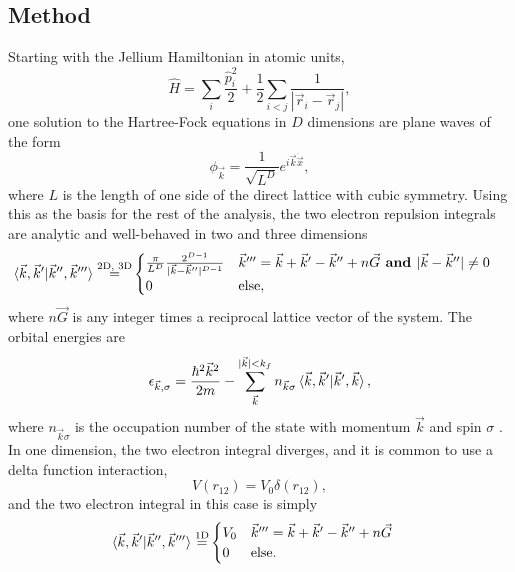 \documentclass[preprint, journal=prl]{revtex4-1}
\begin{document}
\subsection{Method}
  Starting with the Jellium Hamiltonian in atomic units, 
  \begin{equation}\label{hamiltonian}
   	\hat{H} = \sum_i \frac{\hat{p}_i^2}{2}  + \frac{1}{2} \sum_{i < j} \frac{1}{|\vec{r}_i - 
   	\vec{r}_j|},
  \end{equation}
  one solution to the Hartree-Fock equations in $D$ dimensions are plane waves of the form	
  \begin{equation}\label{planewave}
   	\phi_{\vec{k}} =
    \frac{1} { \sqrt{L ^ D} } e ^ {i \vec{k} \dot \vec{x}},
  \end{equation}
  where $L$ is the length of one side of the direct lattice with cubic symmetry. Using this as the basis for the rest of the analysis, the two electron repulsion integrals are analytic and  well-behaved in two and three dimensions\cite{Delyon2008, Guiliani2005}
  \begin{align}
    \braket{\vec{k}, \vec{k}' | \vec{k}'', \vec{k}'''} 
    \stackrel{ \text{2D, 3D} }{=}&
    \begin{cases} 
      \frac{\pi} {L ^ D} \frac{ 2^{D-1} } { | \vec{k} - \vec{k}'' | ^ {D-1} } 
      & \vec{k}''' = \vec{k} + \vec{k}' - \vec{k}'' + n\vec{G} \textbf{ and } | \vec{k} - 
      \vec{k}''| \neq 0 \\
      0 
      & \text{else},
    \end{cases}
  \end{align}
  where $n\vec{G}$ is any integer times a reciprocal lattice vector of the system. The orbital energies are
  \begin{equation}\label{eq:hf_orb_energy}
    \epsilon_{\vec{k},\sigma}=
    \frac{\hbar^2\vec{k}^2}{2m} - \sum\limits_{\vec{k}}^{|\vec{k}|< 
    k_f}n_{\vec{k}\sigma}\braket{\vec{k}, \vec{k}' |\vec{k}', \vec{k}},
  \end{equation}
  where $n_{\vec{k}\sigma}$ is the occupation number of the state with momentum $\vec{k}$ and spin $\sigma$ \cite{Guiliani2005}. In one dimension, the two electron integral diverges, and it is common to use a delta function interaction, 
  \begin{equation}
    V(r_{12}) = V_0\delta(r_{12}),
  \end{equation}
  and the two electron integral in this case is simply
  \begin{align}
    \braket{\vec{k}, \vec{k}' | \vec{k}'', \vec{k}'''} 
    \stackrel{ \text{1D} }{=}&
    \begin{cases} 
      V_0 
      & \vec{k}''' = \vec{k} + \vec{k}' - \vec{k}'' + n\vec{G}\\
      0 
      & \text{else}.
    \end{cases}
  \end{align}  
    
\end{document}
